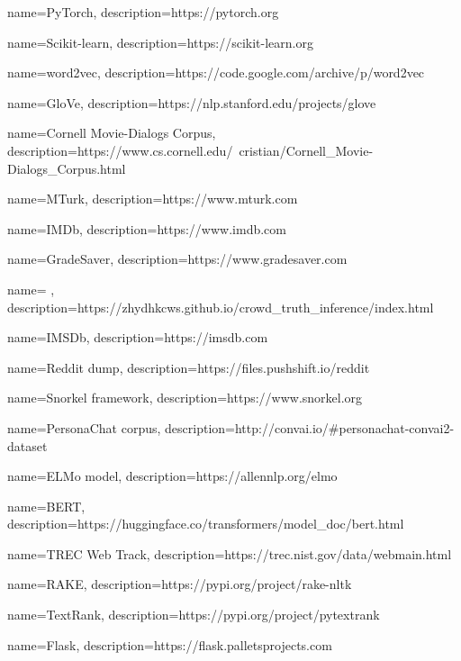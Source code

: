 \makeglossaries

{
    name=PyTorch,
    description={https://pytorch.org}
}

{
    name=Scikit-learn,
    description={https://scikit-learn.org}
}

{
    name=word2vec,
    description={https://code.google.com/archive/p/word2vec}
}

{
    name=GloVe,
    description={https://nlp.stanford.edu/projects/glove}
}

{
    name=Cornell Movie-Dialogs Corpus,
    description={https://www.cs.cornell.edu/~cristian/Cornell_Movie-Dialogs_Corpus.html}
}

{
    name=MTurk,
    description={https://www.mturk.com}
}

{
    name=IMDb,
    description={https://www.imdb.com}
}

{
    name=GradeSaver,
    description={https://www.gradesaver.com}
}

{
    name= ,
    description={https://zhydhkcws.github.io/crowd_truth_inference/index.html}
}

{
    name=IMSDb,
    description={https://imsdb.com}
}

{
    name=Reddit dump,
    description={https://files.pushshift.io/reddit}
}

{
    name=Snorkel framework,
    description={https://www.snorkel.org}
}

{
    name=PersonaChat corpus,
    description={http://convai.io/\#personachat-convai2-dataset}
}

{
    name=ELMo model,
    description={https://allennlp.org/elmo}
}

{
    name=BERT,
    description={https://huggingface.co/transformers/model_doc/bert.html}
}

{
    name=TREC Web Track,
    description={https://trec.nist.gov/data/webmain.html}
}

{
    name=RAKE,
    description={https://pypi.org/project/rake-nltk}
}

{
    name=TextRank,
    description={https://pypi.org/project/pytextrank}
}

{
    name=Flask,
    description={https://flask.palletsprojects.com}
}